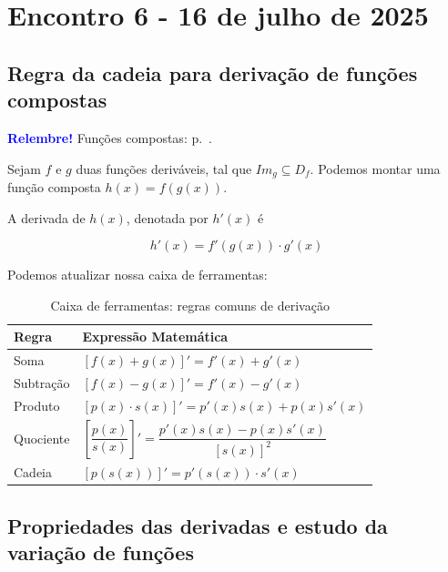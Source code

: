 \documentclass[12pt,openright,twoside,a4paper]{article}
\theoremstyle{definition}
\begin{document}
	\pagebreak
	\section{Encontro 6 - 16 de julho de 2025}
	
	\subsection{Regra da cadeia para derivação de funções compostas}
	
	\begin{snugshade}
		\textbf{\textcolor{blue}{Relembre!}} Funções compostas: p.~\pageref{subsec:funcoes_compostas}.
	\end{snugshade}
	
	
		Sejam $f$ e $g$ duas funções deriváveis, tal que $Im_g \subseteq D_f$. Podemos montar uma função composta $h(x) = f(g(x))$.
		
		A derivada de $h(x)$, denotada por $h'(x)$ é
		
		\begin{equation}
			\boxed{h'(x) = f'(g(x)) \cdot g'(x)}
		\end{equation}
	
	Podemos atualizar nossa caixa de ferramentas:
	
		\renewcommand{\arraystretch}{2.5}
	\begin{table}[h]
		\centering
		\caption{Caixa de ferramentas: regras comuns de derivação}
		\begin{tabular}{|>{\centering\arraybackslash}m{3cm}|>{\centering\arraybackslash}m{10cm}|}
			\hline
			\textbf{Regra} & \textbf{Expressão Matemática} \\
			\hline
			Soma & $\displaystyle[f(x) + g(x)]' = f'(x) + g'(x)$ \\
			\hline
			Subtração & $\displaystyle [f(x) - g(x)]' = f'(x) - g'(x)$ \\
			\hline
			Produto & $\displaystyle [p(x) \cdot s(x)]' = p'(x)s(x) + p(x)s'(x)$ \\
			\hline
			Quociente & $\displaystyle \left[\dfrac{p(x)}{s(x)}\right]' = \dfrac{p'(x)s(x) - p(x)s'(x)}{[s(x)]^2}$ \\
			\hline
			Cadeia & $\displaystyle [p(s(x))]' = p'(s(x)) \cdot s'(x)$\\
			\hline
		\end{tabular}
	\end{table}
	\renewcommand{\arraystretch}{1.0}
	
	\subsection{Propriedades das derivadas e estudo da variação de funções}
	
\end{document}
